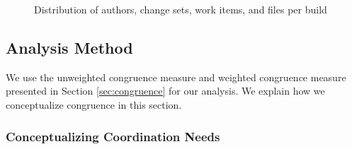 \begin{figure}[ht]
{		\label{fig:hist_workitems}
	}	
	\caption{Distribution of authors, change sets, work items, and files per build}
	\label{fig:entities_per_build}

\end{figure}

%

\subsection{Analysis Method}
\label{sec:analysis}

We use the unweighted congruence measure and weighted congruence measure presented in Section \ref{sec:congruence} for our analysis. We explain how we conceptualize congruence in this section.

\subsubsection{Conceptualizing Coordination Needs}

